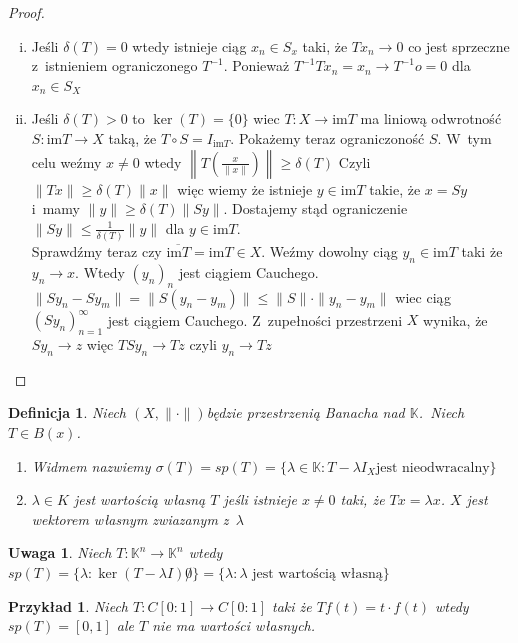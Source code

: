 \documentclass[11pt]{mwrep}
\renewcommand{\[}{\begin{equation}}
\renewcommand{\]}{\end{equation}}
\newcommand{\K}{\ensuremath{\mathbb{K}}}
\newcommand{\norm}{\|\cdot\|}
\newcommand{\spac}[1][X]{$(#1,\norm)$}
\newcommand{\im}{\mathrm{im}}
\newtheorem{uwaga}[subsection]{Uwaga}
\newtheorem{de}[subsection]{Definicja}
\newtheorem{ex}[subsection]{Przykład}
\newcounter{numer}
\begin{document}
\begin{proof}
	\begin{enumerate}[(i)]
		\item Jeśli $ \delta(T) =0$ wtedy istnieje ciąg $x_n \in S_x$ taki, że $T{x_{n}}\to 0$ co jest sprzeczne 
			z~istnieniem ograniczonego $T^{-1}$.  Ponieważ $ T^{-1 }T x_n = x_n \to T^{-1}o = 0$ dla $x_n \in S_X$ 
		\item Jeśli $\delta(T)>0$ to $\ker(T) = \{0\}$ wiec $ T\colon X \to \im T$ ma liniową odwrotność
			$S\colon \im T \to X$ taką, że $T\circ S = I_{\im T}$.
			Pokażemy teraz ograniczoność $S$. W~tym celu weźmy $x\not = 0$ wtedy $\left\|T\left( \frac{x}{\|x\|} \right)\right\|\ge \delta(T)$
			Czyli $\|Tx\| \ge \delta(T) \|x\|$ więc wiemy że istnieje $y\in \im T$ takie, że $x=Sy$ i~mamy 
			$\|y\|\ge \delta(T) \|Sy\|$.
			Dostajemy stąd ograniczenie $\|Sy\| \le \frac{1}{\delta(T)}\|y\|$ dla $y\in \im T$.\\
			Sprawdźmy teraz czy $\overline{\im T} = \im T \in X$.
			Weźmy dowolny ciąg $y_n \in \im T$ taki że $y_n \to x$.  Wtedy $(y_n)_n$ jest ciągiem Cauchego. 
			$\|S{y_n} - S{y_m}\|=\|S(y_n - y_m)\|\le \|S\| \cdot \|y_n -y_m\|$ wiec ciąg $(S y_n)_{n=1}^\infty$ jest ciągiem Cauchego.
			Z~zupełności przestrzeni $X$ wynika, że $S y_n \to z$ więc $T S y_n \to T z$ czyli $y_n \to Tz$ 
	\end{enumerate}
\end{proof}
\begin{de}
	Niech \spac będzie przestrzenią Banacha nad \K.~Niech $T \in B(x)$.
	\begin{enumerate}
		\item Widmem nazwiemy $\sigma(T) = sp(T) = \{ \lambda \in \K : T -\lambda I_X \textrm{jest nieodwracalny}\}$ 
		\item $\lambda\in K$ jest wartością własną $T$ jeśli istnieje $x\not  =0$ taki, że $Tx = \lambda x$. 
			$X$ jest wektorem  własnym zwiazanym z~$\lambda$
	\end{enumerate}
\end{de}
\begin{uwaga}
	Niech $T\colon \K^n \to \K^n$ wtedy $sp(T) = \{\lambda: \ker(T-\lambda I) \not 0\} = \{\lambda :\lambda \textrm{ jest wartością własną} \}$
\end{uwaga}
\begin{ex}
	Niech $T\colon C[0:1] \to C[0:1]$ taki że $Tf(t) = t\cdot f(t)$ wtedy $sp(T) = [0,1]$ ale $T$ nie ma wartości własnych.
\end{ex}
\end{document}
